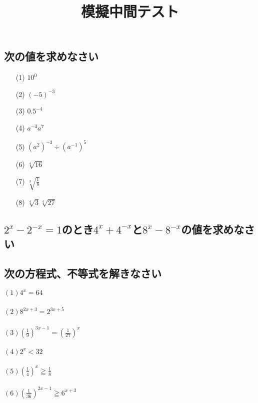 \documentclass[twocolumn, 20pt]{jarticle}
\title{模擬中間テスト}
\begin{document}
\columnseprule=0.2mm
\date{}
\maketitle
\vspace{-2cm}
\subsection{次の値を求めなさい}
\begin{itemize}
  \item [(1)] $ \displaystyle 10^0$
  \item [(2)] $\displaystyle (-5)^{-3}$
  \item [(3)] $\displaystyle {0.5}^{-4}$
  \item [(4)] $\displaystyle a^{-3}a^{7}$
  \item [(5)] $\displaystyle (a^2)^{-3} \div (a^{-1})^5$
  \item [(6)] $\displaystyle \sqrt[4]{16}$
  \item [(7)] $\displaystyle \sqrt[3]{\frac{1}{8}}$
  \item [(8)] $\displaystyle \sqrt[4]{3}\sqrt[4]{27}$
\end{itemize}

\subsection{$2^x - 2^{-x} = 1$のとき$4^x + 4^{-x}$と$8^x - 8^{-x}$の値を求めなさい}


\subsection{次の方程式、不等式を解きなさい}
$\displaystyle (1) 4^x = 64$
\\
\\
$\displaystyle (2) 8^{2x+3} = 2^{3x + 5}$
\\
\\
$\displaystyle (3) (\frac{1}{9})^{3x-1} = (\frac{1}{27})^{x}$
\\
\\
$\displaystyle (4) 2^x < 32$
\\
\\
$\displaystyle (5) (\frac{1}{4})^x \geqq \frac{1}{8}$
\\
\\
$\displaystyle (6) (\frac{1}{36})^{2x-1} \geqq 6^{x+3}$
\end{document}
